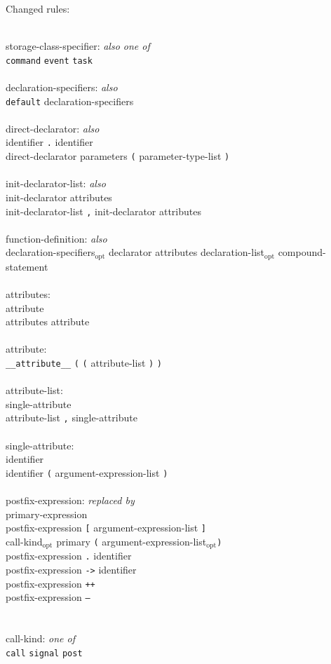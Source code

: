\documentclass[11pt]{article}
\newcommand{\kw}[1]{{\tt #1}}
\newcommand{\opt}{$_{\mbox{opt}}$\xspace}
\begin{document}
Changed rules: 
\em \begin{tabbing}
\hspace*{2cm}\= \\ \kill
storage-class-specifier: \emph{also one of}\\
\>	\kw{command} \kw{event} \kw{task}\\
\\
declaration-specifiers: \emph{also}\\
\>	\kw{default} declaration-specifiers\\
\\
direct-declarator: \emph{also}\\
\>	identifier \kw{.} identifier \\
\>	direct-declarator parameters \kw{(} parameter-type-list \kw{)}\\
\\
init-declarator-list: \emph{also}\\
\>	init-declarator attributes\\
\>	init-declarator-list \kw{,} init-declarator attributes\\
\\
function-definition: \emph{also}\\
\>	declaration-specifiers\opt declarator attributes declaration-list\opt compound-statement\\
\\
attributes:\\
\>	attribute\\
\>	attributes attribute\\
\\
attribute:\\
\>	\kw{\_\_attribute\_\_} \kw{(} \kw{(} attribute-list \kw{)} \kw{)}\\
\\
attribute-list:\\
\>	single-attribute\\
\>	attribute-list \kw{,} single-attribute\\
\\
single-attribute:\\
\>	identifier\\
\>	identifier \kw{(} argument-expression-list \kw{)}\\
\\
postfix-expression: \emph{replaced by}\\
\>	primary-expression\\
\>	postfix-expression \kw{[} argument-expression-list \kw{]}\\
\>	call-kind\opt primary \kw{(} argument-expression-list\opt \kw{)}\\
\>	postfix-expression \kw{.} identifier\\
\>	postfix-expression \kw{->} identifier\\
\>	postfix-expression \kw{++}\\
\>	postfix-expression \kw{--}\\
\\\\
call-kind: \emph{one of}\\
\>	\kw{call} \kw{signal} \kw{post}
\end{tabbing} \rm
\end{document}
